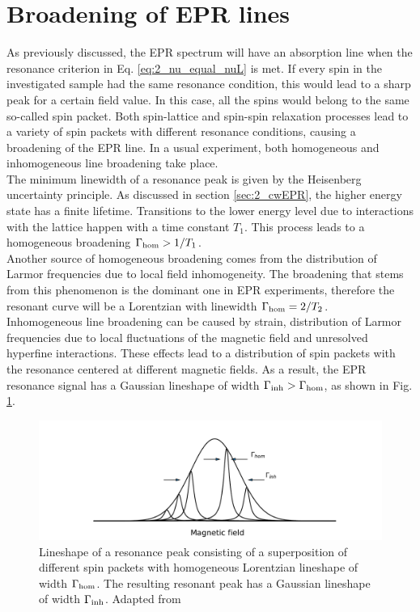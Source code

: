 \documentclass[a4paper]{book}
\newcommand{\tsub}{\textsubscript}
\begin{document}
	\section{Broadening of EPR lines}
	As previously discussed, the EPR spectrum will have an absorption line when the resonance criterion in Eq. \eqref{eq:2_nu_equal_nuL} is met. If every spin in the investigated sample had the same resonance condition, this would lead to a sharp peak for a certain field value. In this case, all the spins would belong to the same so-called spin packet. Both spin-lattice and spin-spin relaxation processes lead to a variety of spin packets with different resonance conditions, causing a broadening of the EPR line. In a usual experiment, both homogeneous and inhomogeneous line broadening take place.\\
	The minimum linewidth of a resonance peak is given by the Heisenberg uncertainty principle. As discussed in section \ref{sec:2_cwEPR}, the higher energy state has a finite lifetime. Transitions to the lower energy level due to interactions with the lattice happen with a time constant $T_1$. This process leads to a homogeneous broadening $\Gamma\tsub{hom} > 1/T_1$.\\
	Another source of homogeneous broadening comes from the distribution of Larmor frequencies due to local field inhomogeneity. The broadening that stems from this phenomenon is the dominant one in EPR experiments, therefore the resonant curve will be a Lorentzian with linewidth $\Gamma\tsub{hom} = 2/T_2$.\\
	Inhomogeneous line broadening can be caused by strain, distribution of Larmor frequencies due to local fluctuations of the magnetic field and unresolved hyperfine interactions. These effects lead to a distribution of spin packets with the resonance centered at different magnetic fields. As a result, the EPR resonance signal has a Gaussian lineshape of width $\Gamma\tsub{inh} > \Gamma\tsub{hom}$, as shown in Fig. \ref{fig:2_broadening}.
	\begin{figure}
		\centering
		\includegraphics[width=\textwidth]{images/2_broadening}
		\caption{Lineshape of a resonance peak consisting of a superposition of different spin packets with homogeneous Lorentzian lineshape of width $\Gamma\tsub{hom}$. The resulting resonant peak has a Gaussian lineshape of width $\Gamma\tsub{inh}$. Adapted from \cite{schweigerPrinciplesPulseElectron2001}}
		\label{fig:2_broadening}
	\end{figure}
	
\end{document}
